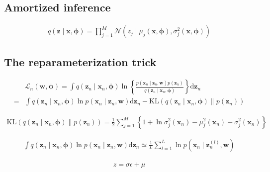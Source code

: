 \documentclass{article}
\begin{document}
\subsection{Amortized inference}

\begin{align*}
q(\mathbf{z} \mid \mathbf{x}, \boldsymbol{\phi})=\prod_{j=1}^{M} \mathcal{N}\left(z_{j} \mid \mu_{j}(\mathbf{x}, \boldsymbol{\phi}), \sigma_{j}^{2}(\mathbf{x}, \boldsymbol{\phi})\right) 
\tag{19.13}
\end{align*}

\subsection{The reparameterization trick}

\begin{align*}
& \mathcal{L}_{n}(\mathbf{w}, \boldsymbol{\phi})=\int q\left(\mathbf{z}_{n} \mid \mathbf{x}_{n}, \boldsymbol{\phi}\right) \ln \left\{\frac{p\left(\mathbf{x}_{n} \mid \mathbf{z}_{n}, \mathbf{w}\right) p\left(\mathbf{z}_{n}\right)}{q\left(\mathbf{z}_{n} \mid \mathbf{x}_{n}, \boldsymbol{\phi}\right)}\right\} \mathrm{d} \mathbf{z}_{n} \\
= & \int q\left(\mathbf{z}_{n} \mid \mathbf{x}_{n}, \boldsymbol{\phi}\right) \ln p\left(\mathbf{x}_{n} \mid \mathbf{z}_{n}, \mathbf{w}\right) \mathrm{d} \mathbf{z}_{n}-\mathrm{KL}\left(q\left(\mathbf{z}_{n} \mid \mathbf{x}_{n}, \boldsymbol{\phi}\right) \| p\left(\mathbf{z}_{n}\right)\right) 
\tag{19.14}
\end{align*}

\begin{align*}
\mathrm{KL}\left(q\left(\mathbf{z}_{n} \mid \mathbf{x}_{n}, \boldsymbol{\phi}\right) \| p\left(\mathbf{z}_{n}\right)\right)=\frac{1}{2} \sum_{j=1}^{M}\left\{1+\ln \sigma_{j}^{2}\left(\mathbf{x}_{n}\right)-\mu_{j}^{2}\left(\mathbf{x}_{n}\right)-\sigma_{j}^{2}\left(\mathbf{x}_{n}\right)\right\} 
\tag{19.15}
\end{align*}

\begin{align*}
\int q\left(\mathbf{z}_{n} \mid \mathbf{x}_{n}, \boldsymbol{\phi}\right) \ln p\left(\mathbf{x}_{n} \mid \mathbf{z}_{n}, \mathbf{w}\right) \mathrm{d} \mathbf{z}_{n} \simeq \frac{1}{L} \sum_{l=1}^{L} \ln p\left(\mathbf{x}_{n} \mid \mathbf{z}_{n}^{(l)}, \mathbf{w}\right) 
\tag{19.16}
\end{align*}

\begin{align*}
z=\sigma \epsilon+\mu 
\tag{19.17}
\end{align*}
\end{document}
